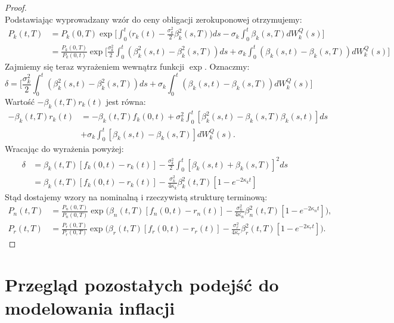 \documentclass{mini}
\theoremstyle{mythstyle}
\begin{document}
\begin{proof}
\begin{equation}
	\end{equation}
	Podstawiając wyprowadzany wzór do ceny obligacji zerokuponowej otrzymujemy:
	\begin{align}
		P_k(t,T) &= P_k(0,T) \exp\bigg[ \int_{0}^{t}\bigg( r_k(t) - \frac{\sigma_k^2}{2}\beta_k^2(s,T)\bigg)ds - \sigma_k\int_{0}^{t} \beta_k(s,T)dW_k^Q(s)  \bigg] \\
		&= \frac{P_k(0,T)}{P_k(0,t)} \exp \bigg[ \frac{\sigma_k^2}{2} \int_{0}^{t} (\beta_k^2(s,t) - \beta_k^2(s,T))ds + \sigma_k\int_{0}^{t} (\beta_k(s,t) - \beta_k(s,T)) dW_k^Q(s) \bigg]
	\end{align}
	Zajmiemy się teraz wyrażeniem wewnątrz funkcji $\exp$. Oznaczmy:
	\begin{equation}
		\delta = \bigg[ \frac{\sigma_k^2}{2} \int_{0}^{t} (\beta_k^2(s,t) - \beta_k^2(s,T))ds + \sigma_k\int_{0}^{t} (\beta_k(s,t) - \beta_k(s,T)) dW_k^Q(s) \bigg]
	\end{equation}
	Wartość $-\beta_k(t,T)r_k(t)$ jest równa:
	\begin{align}
		-\beta_k(t,T)r_k(t) &= -\beta_k(t,T)f_k(0,t) + \sigma_k^2\int_{0}^{t} [\beta_k^2(s,t) - \beta_k(s,T)\beta_k(s,t)]ds \\ &+ \sigma_k\int_{0}^{t} [\beta_k(s,t) - \beta_k(s,T)]dW_k^Q(s).
	\end{align}
	Wracając do wyrażenia powyżej:
	\begin{align}
		\delta &= \beta_k(t,T)[f_k(0,t) - r_k(t)]-\frac{\sigma_k^2}{2}\int_{0}^{t}[\beta_k(s,t) + \beta_k(s,T)]^2ds \\
		&= \beta_k(t,T)[f_k(0,t) - r_k(t)]-\frac{\sigma_k^2}{4\kappa_k}\beta_k^2(t,T)[1-e^{-2\kappa_kt}] 
	\end{align}
	Stąd dostajemy wzory na nominalną i rzeczywistą strukturę terminową:
	\begin{align}
		P_n(t, T) &= \frac{P_n(0,T)}{P_n(0,T)} \exp\bigg( \beta_n (t, T) [f_n(0,t) - r_n(t) ]  - \frac{\sigma_n^2}{4\kappa_n} \beta_n^2(t,T) [1 - e^{-2\kappa_n t}] \bigg),\\
		P_r(t, T) &= \frac{P_r(0,T)}{P_r(0,T)} \exp\bigg( \beta_r (t, T) [f_r(0,t) - r_r(t) ]  - \frac{\sigma_r^2}{4\kappa_r} \beta_r^2(t,T) [1 - e^{-2\kappa_rt}] \bigg).
	\end{align}
\end{proof}
	
	
	
	\pagebreak
\section{Przegląd pozostałych podejść do modelowania inflacji}
\end{document}
